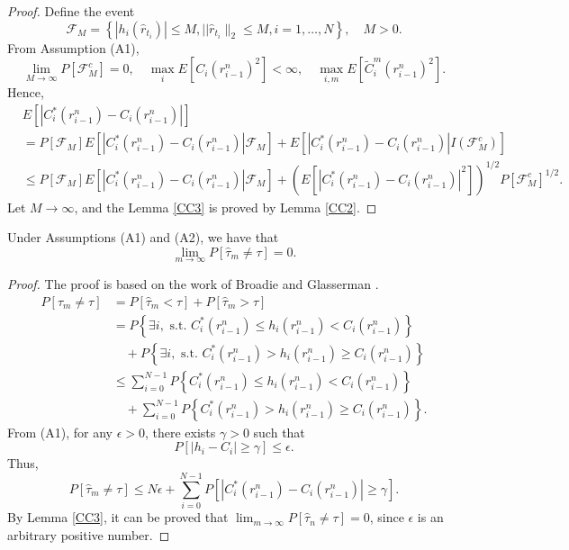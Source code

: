 \documentclass[reqno]{amsart}
\begin{document}
\begin{proof}
Define the event
\[
 \mathcal{F}_M=\left\{\left|h_i\left(\hat{r}_{t_i}\right)\right| 
 \leq M,|| \hat{r}_{t_i} \|_2 \leq M, i=1, \dots, N\right\}, \quad M>0 .
\]
From Assumption (A1),
\[
 \lim _{M \to \infty} P\left[\mathcal{F}_M^c\right]=0, 
 \quad \max_i E\left[C_i\left(r_{i-1}^n\right)^2\right]<\infty,\quad
 \max _{i, m} E\left[\widetilde{C}_i^m\left(r_{i-1}^n\right)^2\right].
\]
Hence,
\begin{align*}
&E\left[\left|C_i^*\left(r_{i-1}^{n}\right)-C_i\left(r_{i-1}^{n}\right)\right|\right] \\
&=  P\left[\mathcal{F}_M\right] E\left[\left|C_i^*\left(r_{i-1}^{n}\right)-C_i\left(r_{i-1}^{n}\right)\right| \mathcal{F}_M\right]+E\left[\left|C_i^*\left(r_{i-1}^{n}\right)-C_i\left(r_{i-1}^{n}\right)\right| I\left(\mathcal{F}_M^c\right)\right] \\
&\leq  P\left[\mathcal{F}_M\right] E\left[\left|C_i^*\left(r_{i-1}^{n}\right)-C_i\left(r_{i-1}^{n}\right)\right| \mathcal{F}_M\right]+\left(E\left[\left|C_i^*\left(r_{i-1}^{n}\right)-C_i\left(r_{i-1}^{n}\right)\right|^2\right]\right)^{1/2} P\left[\mathcal{F}_M^c\right]^{1/2}.
\end{align*}
Let $M \to \infty$, and the Lemma \ref{CC3} is proved by Lemma \ref{CC2}.
\end{proof}

\begin{lemma}
\label{tau}
Under Assumptions {\rm (A1)} and {\rm (A2)}, we have that
 \[
 \lim _{m \to \infty} P\left[\hat{\tau}_m \neq \tau\right]=0 .
 \]
\end{lemma}

\begin{proof}
The proof is based on the work of Broadie and Glasserman \cite{broadie2004stochastic}.
\begin{align*}
P\left[\hat{\tau}_m \neq \tau\right]
&=  P\left[\hat{\tau}_m<\tau\right]+P\left[\hat{\tau}_m>\tau\right] \\
&=  P\left\{\exists i, \text{ s.t. } C_i^*\left(r_{i-1}^{n}\right) \leq h_i\left(r_{i-1}^{n}\right)< C_i\left(r_{i-1}^{n}\right)\right\} \\
&\quad +P\left\{\exists i, \text{ s.t. } C_i^*\left(r_{i-1}^{n}\right) 
 > h_i\left(r_{i-1}^{n}\right) \geq C_i\left(r_{i-1}^{n}\right)\right\} \\
&\leq  \sum_{i=0}^{N-1} P\left\{C_i^*\left(r_{i-1}^{n}\right) 
 \leq h_i\left(r_{i-1}^{n}\right)< C_i\left(r_{i-1}^{n}\right)\right\} \\
&\quad +\sum_{i=0}^{N-1} P\left\{C_i^*\left(r_{i-1}^{n}\right) 
 > h_i\left(r_{i-1}^{n}\right) \geq C_i\left(r_{i-1}^{n}\right)\right\} .
\end{align*}
From (A1), for any $\epsilon>0$, there exists $\gamma>0$ such that
\[
 P\left[\left|h_i-C_i\right| \geq \gamma\right] \leq \epsilon.
\]
Thus,
\[
 P\left[\hat{\tau}_m \neq \tau\right] 
 \leq N \epsilon+\sum_{i=0}^{N-1} P\left[\left|C_i^*\left(r_{i-1}^{n}\right)
 -C_i\left(r_{i-1}^{n}\right)\right| \geq \gamma\right].
\]
By Lemma \ref{CC3}, it can be proved that
$ \lim _{m \to \infty} P\left[\hat{\tau}_n \neq \tau\right]=0$,
since $\epsilon$ is an arbitrary positive number.
\end{proof}
\end{document}
